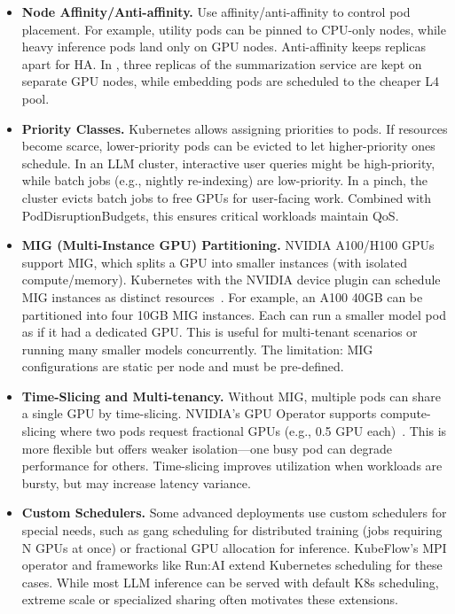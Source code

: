 \begin{itemize}
  \item \textbf{Node Affinity/Anti-affinity.}  
  Use affinity/anti-affinity to control pod placement. For example, utility pods can be pinned to CPU-only nodes, while heavy inference pods land only on GPU nodes. Anti-affinity keeps replicas apart for HA. In \ishtar{}, three replicas of the summarization service are kept on separate GPU nodes, while embedding pods are scheduled to the cheaper L4 pool.

  \item \textbf{Priority Classes.}  
  Kubernetes allows assigning priorities to pods. If resources become scarce, lower-priority pods can be evicted to let higher-priority ones schedule. In an LLM cluster, interactive user queries might be high-priority, while batch jobs (e.g., nightly re-indexing) are low-priority. In a pinch, the cluster evicts batch jobs to free GPUs for user-facing work. Combined with PodDisruptionBudgets, this ensures critical workloads maintain QoS.

  \item \textbf{MIG (Multi-Instance GPU) Partitioning.}  
  NVIDIA A100/H100 GPUs support MIG, which splits a GPU into smaller instances (with isolated compute/memory). Kubernetes with the NVIDIA device plugin can schedule MIG instances as distinct resources~\cite{nvidia_mig_guide}. For example, an A100 40GB can be partitioned into four 10GB MIG instances. Each can run a smaller model pod as if it had a dedicated GPU. This is useful for multi-tenant scenarios or running many smaller models concurrently. The limitation: MIG configurations are static per node and must be pre-defined.

  \item \textbf{Time-Slicing and Multi-tenancy.}  
  Without MIG, multiple pods can share a single GPU by time-slicing. NVIDIA’s GPU Operator supports compute-slicing where two pods request fractional GPUs (e.g., 0.5 GPU each)~\cite{nvidia_mig_guide}. This is more flexible but offers weaker isolation---one busy pod can degrade performance for others. Time-slicing improves utilization when workloads are bursty, but may increase latency variance.

  \item \textbf{Custom Schedulers.}  
  Some advanced deployments use custom schedulers for special needs, such as gang scheduling for distributed training (jobs requiring N GPUs at once) or fractional GPU allocation for inference. KubeFlow’s MPI operator and frameworks like Run:AI extend Kubernetes scheduling for these cases. While most LLM inference can be served with default K8s scheduling, extreme scale or specialized sharing often motivates these extensions.
\end{itemize}

